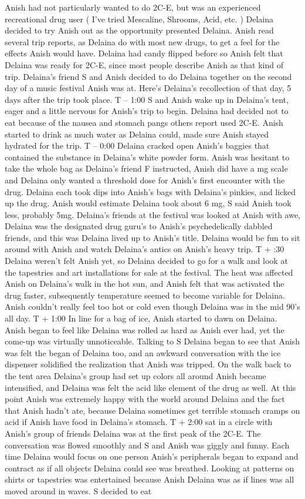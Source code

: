 \documentclass[12pt]{book}
\begin{document}
Anish had not particularly wanted to do 2C-E, but was an experienced recreational drug user ( I've tried Mescaline, Shrooms, Acid, etc. ) Delaina decided to try Anish out as the opportunity presented Delaina. Anish read several trip reports, as Delaina do with most new drugs, to get a feel for the effects Anish would have. Delaina had candy flipped before so Anish felt that Delaina was ready for 2C-E, since most people describe Anish as that kind of trip. Delaina's friend S and Anish decided to do Delaina together on the second day of a music festival Anish was at. Here's Delaina's recollection of that day, 5 days after the trip took place. T -- 1:00 S and Anish wake up in Delaina's tent, eager and a little nervous for Anish's trip to begin. Delaina had decided not to eat because of the nausea and stomach pangs others report used 2C-E. Anish started to drink as much water as Delaina could, made sure Anish stayed hydrated for the trip. T -- 0:00 Delaina cracked open Anish's baggies that contained the substance in Delaina's white powder form. Anish was hesitant to take the whole bag as Delaina's friend F instructed, Anish did have a mg scale and Delaina only wanted a threshold dose for Anish's first encounter with the drug. Delaina each took dips into Anish's bags with Delaina's pinkies, and licked up the drug. Anish would estimate Delaina took about 6 mg, S said Anish took less, probably 5mg. Delaina's friends at the festival was looked at Anish with awe, Delaina was the designated drug guru's to Anish's psychedelically dabbled friends, and this was Delaina lived up to Anish's title. Delaina would be fun to sit around with Anish and watch Delaina's antics on Anish's heavy trip. T + :30 Delaina weren't felt Anish yet, so Delaina decided to go for a walk and look at the tapestries and art installations for sale at the festival. The heat was affected Anish on Delaina's walk in the hot sun, and Anish felt that was activated the drug faster, subsequently temperature seemed to become variable for Delaina. Anish couldn't really feel too hot or cold even though Delaina was in the mid 90's all day. T + 1:00 In line for a bag of ice, Anish started to dawn on Delaina. Anish began to feel like Delaina was rolled as hard as Anish ever had, yet the come-up was virtually unnoticeable. Talking to S Delaina began to see that Anish was felt the began of Delaina too, and an awkward conversation with the ice dispenser solidified the realization that Anish was tripped. On the walk back to the tent area Delaina's group had set up colors all around Anish became intensified, and Delaina was felt the acid like element of the drug as well. At this point Anish was extremely happy with the world around Delaina and the fact that Anish hadn't ate, because Delaina sometimes get terrible stomach cramps on acid if Anish have food in Delaina's stomach. T + 2:00 sat in a circle with Anish's group of friends Delaina was at the first peak of the 2C-E. The conversation was flowed smoothly and S and Anish was giggly and funny. Each time Delaina would focus on one person Anish's peripherals began to expand and contract as if all objects Delaina could see was breathed. Looking at patterns on shirts or tapestries was entertained because Anish Delaina was as if lines was all moved around in waves. S decided to eat 
\end{document}
